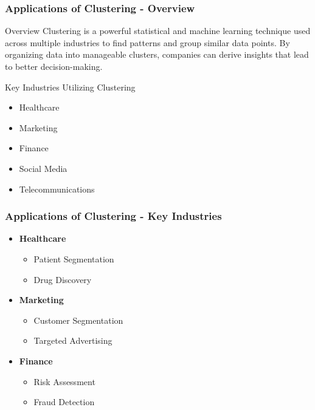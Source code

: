\documentclass[aspectratio=169]{beamer}
\begin{document}
\begin{frame}[fragile]
    \frametitle{Applications of Clustering - Overview}
    \begin{block}{Overview}
        Clustering is a powerful statistical and machine learning technique used across multiple industries to find patterns and group similar data points. 
        By organizing data into manageable clusters, companies can derive insights that lead to better decision-making.
    \end{block}
    \begin{block}{Key Industries Utilizing Clustering}
        \begin{itemize}
            \item Healthcare
            \item Marketing
            \item Finance
            \item Social Media
            \item Telecommunications
        \end{itemize}
    \end{block}
\end{frame}

\begin{frame}[fragile]
    \frametitle{Applications of Clustering - Key Industries}
    \begin{itemize}
        \item \textbf{Healthcare}
            \begin{itemize}
                \item Patient Segmentation 
                \item Drug Discovery
            \end{itemize}
        \item \textbf{Marketing}
            \begin{itemize}
                \item Customer Segmentation 
                \item Targeted Advertising
            \end{itemize}
        \item \textbf{Finance}
            \begin{itemize}
                \item Risk Assessment 
                \item Fraud Detection
            \end{itemize}
    \end{itemize}
\end{frame}
\end{document}
